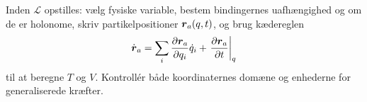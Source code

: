 \begin{method}Inden $\mathcal L$ opstilles: vælg fysiske variable, bestem bindingernes uafhængighed og om de er holonome, skriv partikelpositioner $\boldsymbol{r}_a(q,t)$, og brug kædereglen
\[
\dot{\boldsymbol{r}}_a=\sum_i\frac{\partial\boldsymbol{r}_a}{\partial q_i}\dot q_i+
\left.\frac{\partial\boldsymbol{r}_a}{\partial t}\right|_q
\]
til at beregne $T$ og $V$. Kontrollér både koordinaternes domæne og enhederne for generaliserede kræfter.\end{method}
